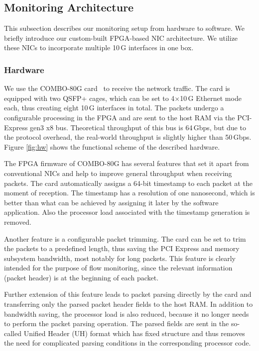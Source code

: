 \subsection{Monitoring Architecture} \label{subsec:high-density-monitoring-architecture}

This subsection describes our monitoring setup from hardware to software. We briefly introduce our custom-built FPGA-based NIC architecture. We utilize these NICs to incorporate multiple 10\,G interfaces in one box.

\subsubsection{Hardware}

We use the COMBO-80G card~\cite{Liberouter--COMBO} to receive the network traffic. The card is equipped with two QSFP+ cages, which can be set to 4$\times$10\,G Ethernet mode each, thus creating eight 10\,G interfaces in total. The packets undergo a configurable processing in the FPGA and are sent to the host RAM via the PCI-Express gen3 x8 bus. Theoretical throughput of this bus is 64\,Gbps, but due to the protocol overhead, the real-world throughput is slightly higher than 50\,Gbps. Figure \ref{fig:hw} shows the functional scheme of the described hardware.

The FPGA firmware of COMBO-80G has several features that set it apart from conventional NICs and help to improve general throughput when receiving packets. The card automatically assigns a 64-bit timestamp to each packet at the moment of reception. The timestamp has a resolution of one nanosecond, which is better than what can be achieved by assigning it later by the software application. Also the processor load associated with the timestamp generation is removed.

Another feature is a configurable packet trimming. The card can be set to trim the packets to a predefined length, thus saving the PCI Express and memory subsystem bandwidth, most notably for long packets. This feature is clearly intended for the purpose of flow monitoring, since the relevant information (packet header) is at the beginning of each packet.

Further extension of this feature leads to packet parsing directly by the card and transferring only the parsed packet header fields to the host RAM. In addition to bandwidth saving, the processor load is also reduced, because it no longer needs to perform the packet parsing operation. The parsed fields are sent in the so-called Unified Header (UH) format which has fixed structure and thus removes the need for complicated parsing conditions in the corresponding processor code.

